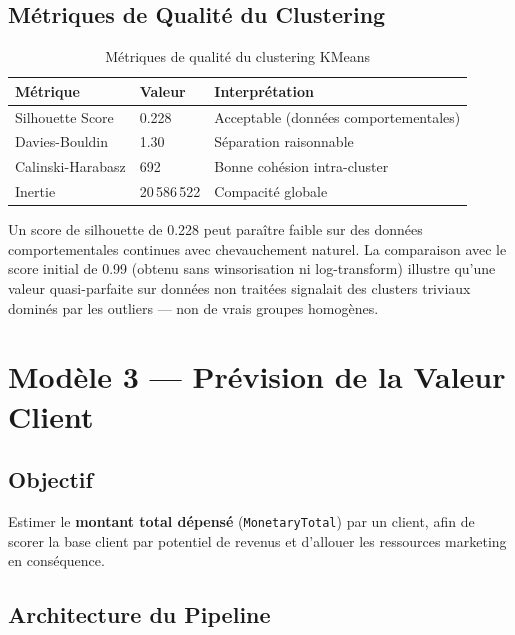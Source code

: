 \documentclass[12pt,a4paper]{article}
\begin{document}
\subsection{Métriques de Qualité du Clustering}

\begin{table}[H]
\centering
\caption{Métriques de qualité du clustering KMeans}
\begin{tabular}{lll}
\toprule
\textbf{Métrique} & \textbf{Valeur} & \textbf{Interprétation} \\
\midrule
Silhouette Score   & 0.228   & Acceptable (données comportementales) \\
Davies-Bouldin     & 1.30    & Séparation raisonnable \\
Calinski-Harabasz  & 692     & Bonne cohésion intra-cluster \\
Inertie            & 20\,586\,522 & Compacité globale \\
\bottomrule
\end{tabular}
\end{table}

\begin{resultbox}
Un score de silhouette de 0.228 peut paraître faible sur des données comportementales continues
avec chevauchement naturel. La comparaison avec le score initial de 0.99 (obtenu sans
winsorisation ni log-transform) illustre qu'une valeur quasi-parfaite sur données non traitées
signalait des clusters triviaux dominés par les outliers — non de vrais groupes homogènes.
\end{resultbox}

\section{Modèle 3 — Prévision de la Valeur Client}

\subsection{Objectif}

Estimer le \textbf{montant total dépensé} (\texttt{MonetaryTotal}) par un client, afin de
scorer la base client par potentiel de revenus et d'allouer les ressources marketing en conséquence.

\subsection{Architecture du Pipeline}
\end{document}
